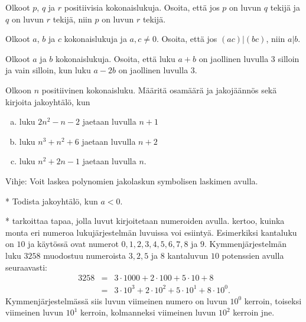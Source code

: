 \begin{kotitehtavasivu}
\begin{tehtava}
	Olkoot $p$, $q$ ja $r$ positiivisia kokonaislukuja. Osoita, että jos $p$ on luvun $q$ tekijä ja $q$ on luvun $r$ tekijä, niin $p$ on luvun $r$ tekijä.
\end{tehtava}

\begin{tehtava}
	Olkoot $a$, $b$ ja $c$ kokonaislukuja ja $a, c \neq 0$. Osoita, että jos $(ac)|(bc)$, niin $a|b$.
\end{tehtava}

\begin{tehtava}
	Olkoot $a$ ja $b$ kokonaislukuja. Osoita, että luku $a + b$ on jaollinen luvulla $3$ silloin ja vain silloin, kun luku $a - 2b$ on jaollinen luvulla $3$.
\end{tehtava}

\begin{tehtava}
	Olkoon $n$ positiivinen kokonaisluku. Määritä osamäärä ja jakojäännös sekä kirjoita jakoyhtälö, kun
	\begin{enumerate}[a)]
	\item luku $2n^2 - n - 2$ jaetaan luvulla $n + 1$
	\item luku $n^3 + n^2 + 6$ jaetaan luvulla $n + 2$
	\item luku $n^2 + 2n - 1$ jaetaan luvulla $n$.
	\end{enumerate}
	Vihje: Voit laskea polynomien jakolaskun symbolisen laskimen avulla.
\end{tehtava}

\begin{tehtava}
	* Todista jakoyhtälö, kun $a<0$.
\end{tehtava}

\begin{tehtava}
	*  tarkoittaa tapaa, jolla luvut kirjoitetaan numeroiden avulla.  kertoo, kuinka monta eri numeroa lukujärjestelmän luvuissa voi esiintyä. Esimerkiksi  kantaluku on $10$ ja käytössä ovat numerot $0, 1, 2, 3, 4, 5, 6, 7, 8$ ja $9$. Kymmenjärjestelmän luku $3258$ muodostuu numeroista $3, 2, 5$ ja $8$ kantaluvun $10$ potenssien avulla seuraavasti:
	\begin{eqnarray*}
	3258 &=&3\cdot 1000+2\cdot 100+5\cdot 10+8\\
	&=& 3\cdot 10^3+2\cdot 10^2+5\cdot 10^1+8\cdot 10^0.
	\end{eqnarray*}
	Kymmenjärjestelmässä siis luvun viimeinen numero on luvun $10^0$ kerroin, toiseksi viimeinen luvun $10^1$ kerroin, kolmanneksi viimeinen luvun $10^2$ kerroin jne.


\end{tehtava}
\end{kotitehtavasivu}
